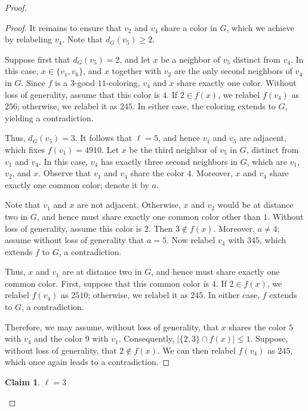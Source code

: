 \documentclass[10pt,a4paper]{amsart}
\newtheorem{claim}{Claim}
\begin{document}
\begin{proof}
\begin{proof}
\noindent It remains to ensure that $v_2$ and $v_4$ share a color in $G$, which we achieve by relabeling $v_4$. Note that $d_G(v_5) \ge 2$.

\noindent Suppose first that $d_G(v_5)=2$, and let $x$ be a neighbor of $v_5$ distinct from $v_4$. In this case, $x \in \{v_1, v_6\}$, and $x$ together with $v_2$ are the only second neighbors of $v_4$ in $G$. Since $f$ is a $3$-good $11$-coloring, $v_4$ and $x$ share exactly one color. Without loss of generality, assume that this color is $4$. If $2 \in f(x)$, we relabel $f(v_4)$ as $256$; otherwise, we relabel it as $245$. In either case, the coloring extends to $G$, yielding a contradiction.

\noindent Thus, $d_G(v_5)=3$. It follows that $\ell=5$, and hence $v_1$ and $v_5$ are adjacent, which fixes $f(v_1)=4910$. Let $x$ be the third neighbor of $v_5$ in $G$, distinct from $v_1$ and $v_4$. In this case, $v_4$ has exactly three second neighbors in $G$, which are $v_1$, $v_2$, and $x$. Observe that $v_1$ and $v_4$ share the color $4$. Moreover, $x$ and $v_4$ share exactly one common color; denote it by $a$.

\noindent Note that $v_1$ and $x$ are not adjacent. Otherwise, $x$ and $v_2$ would be at distance two in $G$, and hence must share exactly one common color other than $1$. Without loss of generality, assume this color is $2$. Then $3 \notin f(x)$. Moreover, $a \neq 4$; assume without loss of generality that $a=5$. Now relabel $v_4$ with $345$, which extends $f$ to $G$, a contradiction.

\noindent Thus, $x$ and $v_1$ are at distance two in $G$, and hence must share exactly one common color. First, suppose that this common color is $4$. If $2 \in f(x)$, we relabel $f(v_4)$ as $2510$; otherwise, we relabel it as $245$. In either case, $f$ extends to $G$, a contradiction.

\noindent Therefore, we may assume, without loss of generality, that $x$ shares the color $5$ with $v_4$ and the color $9$ with $v_1$. Consequently, $|\{2,3\} \cap f(x)| \leq 1$. Suppose, without loss of generality, that $2 \notin f(x)$. We can then relabel $f(v_4)$ as $245$, which once again leads to a contradiction.\end{proof}

\begin{claim}
    $\ell= 3$
\end{claim}


\end{proof}
\end{document}
